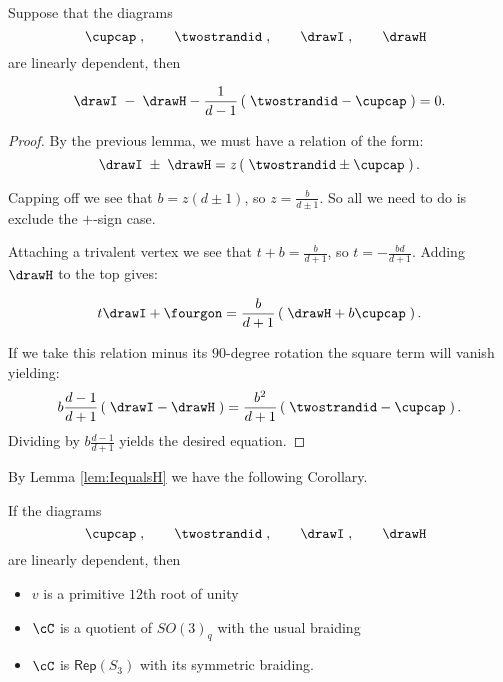 \documentclass[12pt]{amsart}
\begin{document}
\begin{lemma}
Suppose that the diagrams   
  \[
  \cupcap\;,\qquad\twostrandid\;,
    \qquad\drawI\;,\qquad\drawH\;\;
   \]
are linearly dependent, then
 
$$\drawI\; - \; \drawH - \frac{1}{d-1} \left(\; \twostrandid - \cupcap \; \right) = 0.$$
\end{lemma}
\begin{proof}
By the previous lemma, we must have a relation of the form:
$$\drawI\;\pm \; \drawH = z \left(\; \twostrandid \pm \cupcap \;\right).$$

Capping off we see that $b= z (d \pm 1)$, so $z = \frac{b}{d \pm 1}$.  So all we need to do is exclude the $+$-sign case.

Attaching a trivalent vertex we see that $t + b = \frac{b}{d + 1}$, so $t =  -\frac{b d}{d + 1}$.  Adding $\drawH$ to the top gives:

$$t \drawI + \fourgon = \frac{b}{d+1} \left(\; \drawH + b \cupcap \; \right).$$

If we take this relation minus its $90$-degree rotation the square term will vanish yielding:
$$ b \frac{d-1}{d+1} \left(\; \drawI -\drawH \; \right) = \frac{b^2}{d+1} \left(\; \twostrandid - \cupcap \; \right).$$
Dividing by $b \frac{d-1}{d+1}$ yields the desired equation.
\end{proof}

By Lemma \ref{lem:IequalsH} we have the following Corollary.

\begin{corollary}
If the diagrams   
  \[
  \cupcap\;,\qquad\twostrandid\;,
    \qquad\drawI\;,\qquad\drawH\;\;
   \]
are linearly dependent, then
\begin{itemize}
\item $v$ is a primitive $12$th root of unity
\item $\cC$ is a quotient of $SO(3)_q$ with the usual braiding
\item $\cC$ is $\mathsf{Rep}(S_3)$ with its symmetric braiding.
\end{itemize}
\end{corollary}
\end{document}
